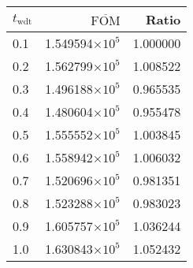 \begin{tabular}{lrr}
\toprule
$t_{\mathrm{wdt}}$ & $\overline{\mathrm{FOM}}$ &    Ratio \\
\midrule
               0.1 &   1.549594$\times 10^{5}$ & 1.000000 \\
               0.2 &   1.562799$\times 10^{5}$ & 1.008522 \\
               0.3 &   1.496188$\times 10^{5}$ & 0.965535 \\
               0.4 &   1.480604$\times 10^{5}$ & 0.955478 \\
               0.5 &   1.555552$\times 10^{5}$ & 1.003845 \\
               0.6 &   1.558942$\times 10^{5}$ & 1.006032 \\
               0.7 &   1.520696$\times 10^{5}$ & 0.981351 \\
               0.8 &   1.523288$\times 10^{5}$ & 0.983023 \\
               0.9 &   1.605757$\times 10^{5}$ & 1.036244 \\
               1.0 &   1.630843$\times 10^{5}$ & 1.052432 \\
\bottomrule
\end{tabular}
